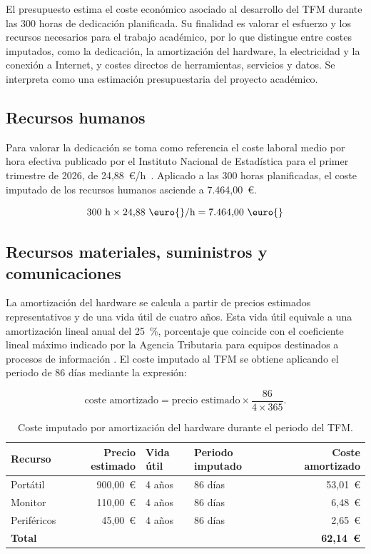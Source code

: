 El presupuesto estima el coste económico asociado al desarrollo del TFM durante las 300 horas de dedicación planificada. Su finalidad es valorar el esfuerzo y los recursos necesarios para el trabajo académico, por lo que distingue entre costes imputados, como la dedicación, la amortización del hardware, la electricidad y la conexión a Internet, y costes directos de herramientas, servicios y datos. Se interpreta como una estimación presupuestaria del proyecto académico.

\subsection*{Recursos humanos}

Para valorar la dedicación se toma como referencia el coste laboral medio por hora efectiva publicado por el Instituto Nacional de Estadística para el primer trimestre de 2026, de 24,88~\euro{}/h~\cite{ineETCL1T2026}. Aplicado a las 300 horas planificadas, el coste imputado de los recursos humanos asciende a 7.464,00~\euro{}.

\[
    300~\text{h} \times 24{,}88~\text{\euro{}/h} = 7{.}464{,}00~\text{\euro{}}
\]

\subsection*{Recursos materiales, suministros y comunicaciones}

La amortización del hardware se calcula a partir de precios estimados representativos y de una vida útil de cuatro años. Esta vida útil equivale a una amortización lineal anual del 25~\%, porcentaje que coincide con el coeficiente lineal máximo indicado por la Agencia Tributaria para equipos destinados a procesos de información \cite{aeatCoeficientesAmortizacion2025}. El coste imputado al TFM se obtiene aplicando el periodo de 86 días mediante la expresión:

\[
    \text{coste amortizado} = \text{precio estimado} \times \frac{86}{4 \times 365}.
\]

\begin{table}[H]
    \centering
    \small
    \begin{tabularx}{\textwidth}{@{}>{\raggedright\arraybackslash}Xrllr@{}}
        \hline
        \textbf{Recurso} & \textbf{Precio estimado} & \textbf{Vida útil} & \textbf{Periodo imputado} & \textbf{Coste amortizado} \\
        \hline
        Portátil & 900,00~\euro{} & 4 años & 86 días & 53,01~\euro{} \\
        Monitor & 110,00~\euro{} & 4 años & 86 días & 6,48~\euro{} \\
        Periféricos & 45,00~\euro{} & 4 años & 86 días & 2,65~\euro{} \\
        \hline
        \textbf{Total} &  &  &  & \textbf{62,14~\euro{}} \\
        \hline
    \end{tabularx}
    \caption{Coste imputado por amortización del hardware durante el periodo del TFM.}
    \label{tab:presupuesto-amortizacion}
\end{table}

